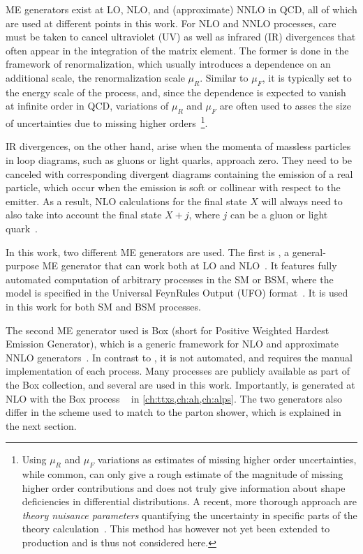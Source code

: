 ME generators exist at LO, NLO, and (approximate) NNLO in QCD, all of which are used at different points in this work. For NLO and NNLO processes, care must be taken to cancel ultraviolet (UV) as well as infrared (IR) divergences that often appear in the integration of the matrix element. The former is done in the framework of renormalization, which usually introduces a dependence on an additional scale, the renormalization scale $\mu_R$. Similar to $\mu_F$, it is typically set to the energy scale of the process, and, since the dependence is expected to vanish at infinite order in QCD, variations of $\mu_R$ and $\mu_F$ are often used to asses the size of uncertainties due to missing higher orders~\cite{Schwartz:2014sze}\footnote{Using $\mu_R$ and $\mu_F$ variations as estimates of missing higher order uncertainties, while common, can only give a rough estimate of the magnitude of missing higher order contributions and does not truly give information about shape deficiencies in differential distributions. A recent, more thorough approach are \textit{theory nuisance parameters} quantifying the uncertainty in specific parts of the theory calculation~\cite{Tackmann:2024kci}. This method has however not yet been extended to \ttbar production and is thus not considered here.}.

IR divergences, on the other hand, arise when the momenta of massless particles in loop diagrams, such as gluons or light quarks, approach zero. They need to be canceled with corresponding divergent diagrams containing the emission of a real particle, which occur when the emission is soft or collinear with respect to the emitter. As a result, NLO calculations for the final state $X$ will always need to also take into account the final state $X+j$, where $j$ can be a gluon or light quark~\cite{Nason:2012pr}. 

In this work, two different ME generators are used. The first is \amcatnlo, a general-purpose ME generator that can work both at LO and NLO~\cite{MG5aMCatNLO:2014}. It features fully automated computation of arbitrary processes in the SM or BSM, where the model is specified in the Universal FeynRules Output (UFO) format~\cite{Degrande:2011ua}. It is used in this work for both SM and BSM processes. 

The second ME generator used is \powheg Box (short for Positive Weighted Hardest Emission Generator), which is a generic framework for NLO and approximate NNLO generators~\cite{Powheg:2004,Powheg:2007,Powheg:2010}. In contrast to \amcatnlo, it is not automated, and requires the manual implementation of each process. Many processes are publicly available as part of the \powheg Box collection, and several are used in this work. Importantly, \pptt is generated at NLO with the \powheg Box process \hvq~\cite{Frixione:2007nw} in \cref{ch:ttxs,ch:ah,ch:alps}. %
The two generators also differ in the scheme used to match to the parton shower, which is explained in the next section.

